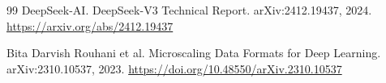 \documentclass[UTF8,11pt,a4paper]{ctexart}
\begin{document}
\begin{thebibliography}{99}
DeepSeek-AI.
\newblock DeepSeek-V3 Technical Report.
\newblock arXiv:2412.19437, 2024.
\newblock \url{https://arxiv.org/abs/2412.19437}

Bita Darvish Rouhani et al.
\newblock Microscaling Data Formats for Deep Learning.
\newblock arXiv:2310.10537, 2023.
\newblock \url{https://doi.org/10.48550/arXiv.2310.10537}

\end{thebibliography}
\end{document}
